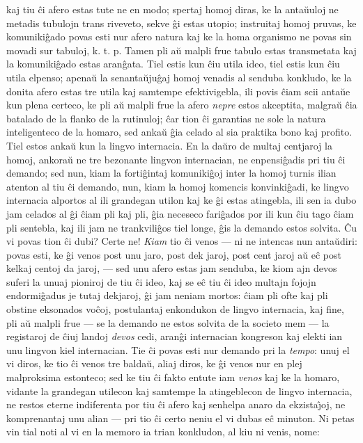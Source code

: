kaj tiu \^ci afero estas tute ne en modo; spertaj homoj diras, ke la
anta\u uuloj ne metadis tubulojn trans riveveto, sekve \^gi estas
utopio; instruitaj homoj pruvas, ke komuniki\^gado povas esti nur
afero natura kaj ke la homa organismo ne povas sin movadi sur
tabuloj, k. t. p. Tamen pli a\u u malpli frue tabulo estas
transmetata kaj la komuniki\^gado estas aran\^gata. Tiel estis kun
\^ciu utila ideo, tiel estis kun \^ciu utila elpenso; apena\u u la
senanta\u uju\^gaj homoj venadis al senduba konkludo, ke la donita
afero estas tre utila kaj samtempe efektivigebla, ili povis \^ciam
scii anta\u ue kun plena certeco, ke pli a\u u malpli frue la afero
{\sl nepre} estos akceptita, malgra\u u \^cia batalado de la flanko
de la rutinuloj; \^car tion \^ci garantias ne sole la natura
inteligenteco de la homaro, sed anka\u u \^gia celado al sia
praktika bono kaj profito. Tiel estos anka\u u kun la lingvo
internacia. En la da\u uro de multaj centjaroj la homoj, ankora\u u
ne tre bezonante lingvon internacian, ne enpensi\^gadis pri tiu \^ci
demando; sed nun, kiam la forti\^gintaj komuniki\^goj inter la homoj
turnis ilian atenton al tiu \^ci demando, nun, kiam la homoj
komencis konvinki\^gadi, ke lingvo internacia alportos al ili
grandegan utilon kaj ke \^gi estas atingebla, ili sen ia dubo jam
celados al \^gi \^ciam pli kaj pli, \^gia neceseco fari\^gados por
ili kun \^ciu tago \^ciam pli sentebla, kaj ili jam ne
trankvili\^gos tiel longe, \^gis la demando estos solvita. \^Cu vi
povas tion \^ci dubi? Certe ne! {\sl Kiam} tio \^ci venos --- ni ne
intencas nun anta\u udiri: povas esti, ke \^gi venos post unu jaro,
post dek jaroj, post cent jaroj a\u u e\^c post kelkaj centoj da
jaroj, --- sed unu afero estas jam senduba, ke kiom ajn devos suferi
la unuaj pioniroj de tiu \^ci ideo, kaj se e\^c tiu \^ci ideo
multajn fojojn endormi\^gadus je tutaj dekjaroj, \^gi jam neniam
mortos: \^ciam pli ofte kaj pli obstine eksonados vo\^coj,
postulantaj enkondukon de lingvo internacia, kaj fine, pli a\u u
malpli frue --- se la demando ne estos solvita de la societo mem
--- la registaroj de \^ciuj landoj {\sl devos} cedi, aran\^gi internacian
kongreson kaj elekti ian unu lingvon kiel internacian. Tie \^ci
povas esti nur demando pri la {\sl tempo}: unuj el vi diros, ke tio
\^ci venos tre balda\u u, aliaj diros, ke \^gi venos nur en plej
malproksima estonteco; sed ke tiu \^ci fakto entute iam {\sl venos}
kaj ke la homaro, vidante la grandegan utilecon kaj samtempe la
atingeblecon de lingvo internacia, ne restos eterne indiferenta por
tiu \^ci afero kaj senhelpa anaro da ekzista\^{\j}oj, ne
komprenantaj unu alian --- pri tio \^ci certo neniu el vi dubas e\^c
minuton. Ni petas vin tial noti al vi en la memoro ia trian
konkludon, al kiu ni venis, nome:

